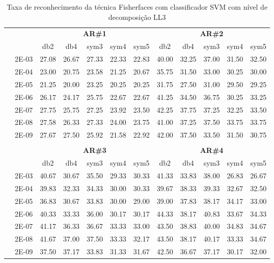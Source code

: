 


\begin{table}[H]
	\centering
    \normalsize
	\caption{Taxa de reconhecimento da técnica Fisherfaces com classificador SVM com nível de decomposição LL3}
	\begin{tabular}{|c|c|c c c c c|c c c c c|}
\cline{3-12}
\multicolumn{2}{c|}{\multirow{2}{*}{}} & \multicolumn{5}{c|}{\textbf{AR\#1}}  & \multicolumn{5}{c|}{\textbf{AR\#2}} \\\cline{3-12}

\multicolumn{2}{c|}{}  & db2 & db4 & sym3 & sym4 & sym5 & db2 & db4& sym3 & sym4 & sym5 \\\hline
\multicolumn{1}{|c|}{ \multirow{6}{*}{\rotatebox[origin=c]{90}{\textbf{Gamma}}} }
&2E-03&	27.08&	26.67&	27.33&	22.33&	22.83&	40.00	&32.25&	37.00&	31.50&	32.50	\\\cline{2-12}
&2E-04&	23.00&	20.75&	23.58&	21.25&	20.67&	35.75	&31.50&	33.00&	30.25&	30.00	\\\cline{2-12}
&2E-05&	21.25&	20.00&	23.25&	20.25&	20.25&	31.75	&27.50&	31.00&	29.50&	29.25	\\\cline{2-12}
&2E-06&	26.17&	24.17&	25.75&	22.67&	22.67&	41.25	&34.50&	36.75&	30.25&	33.25	\\\cline{2-12}
&2E-07&	27.75&	25.75&	27.25&	23.92&	23.50&	42.25	&37.75&	37.25&	32.25&	33.50	\\\cline{2-12}
&2E-08&	27.58&	26.33&	27.33&	24.00&	23.75&	41.00	&37.25&	37.50&	33.75&	33.75	\\\cline{2-12}
&2E-09&	27.67&	27.50&	25.92&	21.58&	22.92&	42.00	&37.50&	33.50&	31.50&	30.75	

\\ \midrule
\multicolumn{12}{c}{}\\ 

\cline{3-12}
\multicolumn{2}{c}{} & \multicolumn{5}{|c|}{\textbf{AR\#3}}  & \multicolumn{5}{c|}{\textbf{AR\#4}} \\\cline{3-12}
\multicolumn{2}{c}{}  & \multicolumn{1}{|c}{db2} & db4 & sym3 & sym4 & sym5 & db2 & db4& sym3 & sym4 & sym5 \\\hline
\multicolumn{1}{|c|}{ \multirow{6}{*}{\rotatebox[origin=c]{90}{\textbf{Gamma}}} }
&2E-03&	40.67&	30.67&	35.50&	29.33&	30.33&	41.33	&33.83&	38.00&	26.83&	26.67	\\\cline{2-12}
&2E-04&	39.83&	32.33&	34.33&	30.00&	30.33&	39.67	&38.33&	39.33&	32.67&	32.50	\\\cline{2-12}
&2E-05&	36.83&	30.67&	33.83&	30.00&	29.00&	39.00	&37.83&	38.17&	34.17&	33.00	\\\cline{2-12}
&2E-06&	40.33&	33.33&	36.00&	30.17&	30.17&	44.33	&38.17&	40.83&	33.67&	34.33	\\\cline{2-12}
&2E-07&	41.17&	36.33&	36.67&	33.33&	33.00&	43.50	&38.83&	40.00&	34.83&	34.67	\\\cline{2-12}
&2E-08&	41.67&	37.00&	37.50&	33.33&	32.17&	43.50	&38.17&	40.17&	33.33&	34.67	\\\cline{2-12}
&2E-09&	37.50&	37.17&	33.83&	31.33&	31.67&	42.50	&36.67&	37.17&	30.17&	32.00	
	

\end{tabular}
\end{table}
